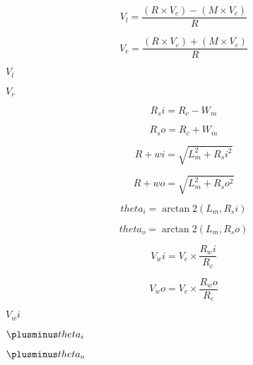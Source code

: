 \documentclass{article}
\begin{document}
\[ V_l = \frac{(R \times V_c)-(M \times V_c)}{R} \]
\pagebreak

\[ V_r = \frac{(R \times V_c)+(M \times V_c)}{R} \]
\pagebreak

$ V_l $
\pagebreak

$ V_r $
\pagebreak

\[ R_si = R_c - W_m \]
\pagebreak

\[ R_so = R_c + W_m \]
\pagebreak

\[ R+wi = \sqrt{L_m ^2 + R_si ^2} \]
\pagebreak

\[ R+wo = \sqrt{L_m ^2 + R_so ^2} \]
\pagebreak

\[ theta_i = \arctan 2(L_m,R_si) \]
\pagebreak

\[ theta_o = \arctan 2(L_m,R_so) \]
\pagebreak

\[ V_wi = V_c \times \frac{R_wi}{R_c} \]
\pagebreak

\[ V_wo = V_c \times \frac{R_wo}{R_c} \]
\pagebreak

$ V_wi $
\pagebreak

$ \plusminus theta_i $
\pagebreak

$ \plusminus theta_o $
\pagebreak
\end{document}
